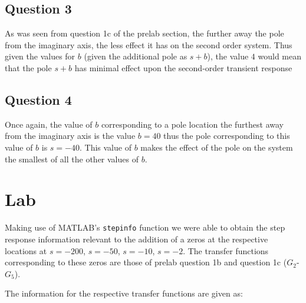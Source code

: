 \documentclass[12pt, a4paper]{article}
\begin{document}
			\subsection{Question 3} %
			\label{sub:question_3}
			As was seen from question 1c of the prelab section, the further away the pole from the imaginary axis, the less effect it has on the second order system. Thus given the values for $b$ (given the additional pole as $s+b$), the value $4$ would mean that the pole $s+b$ has minimal effect upon the second-order transient response	

			\subsection{Question 4} %
			\label{sub:question_4}
			Once again, the value of $b$ corresponding to a pole location the furthest away from the imaginary axis is the value $b=40$ thus the pole corresponding to this value of $b$ is $s=-40$. This value of $b$ makes the effect of the pole on the system the smallest of all the other values of $b$.
			

	\section{Lab} %
	\label{sec:lab}
	Making use of MATLAB's \texttt{stepinfo} function we were able to obtain the step response information relevant to the addition of a zeros at the respective locations at $s=-200$, $s=-50$, $s=-10$, $s=-2$. The transfer functions corresponding to these zeros are those of prelab question 1b and question 1c ($G_2$-$G_5$).

	The information for the respective transfer functions are given as:
\end{document}
